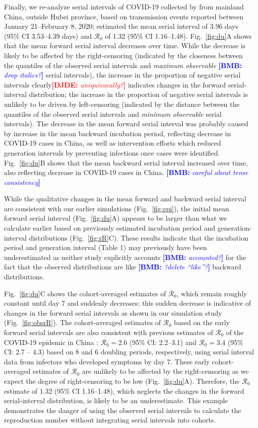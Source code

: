 \documentclass[12pt]{article}
\newcommand{\comment}{\showcomment}
\newcommand{\showcomment}[3]{\textcolor{#1}{\textbf{[#2: }\textsl{#3}\textbf{]}}}
\newcommand{\bmb}[1]{\comment{blue}{BMB}{#1}}
\newcommand{\djde}[1]{\comment{red}{DJDE}{#1}}
\newcommand{\fref}[1]{Fig.~\ref{fig:#1}}
\newcommand{\Rx}[1]{\ensuremath{{\mathcal R}_{#1}}\xspace}
\newcommand{\Ro}{\Rx{0}}
\begin{document}
Finally, we re-analyze serial intervals of COVID-19 collected by \cite{du2020serial} from mainland China, outside Hubei province, based on transmission events reported between January 21--February 8, 2020;
\cite{du2020serial} estimated the mean serial interval of 3.96 days (95\% CI 3.53–4.39 days) and \Ro of 1.32 (95\% CI 1.16–1.48).
\fref{du}A shows that the mean forward serial interval decreases over time.
While the decrease is likely to be affected by the right-censoring (indicated by the closeness between the quantiles of the observed serial intervals and \emph{maximum observable} \bmb{drop italics?} serial intervals), the increase in the proportion of negative serial intervals clearly\djde{unequivocally?} indicates changes in the forward serial-interval distribution;
the increase in the proportion of negative serial intervals is unlikely to be driven by left-censoring (indicated by the distance between the quantiles of the observed serial intervals and \emph{minimum observable} serial intervals).
The decrease in the mean forward serial interval was probably caused by increase in the mean backward incubation period, reflecting decrease in COVID-19 cases in China, as well as intervention efforts which reduced generation intervals by preventing infections once cases were identified.
\fref{du}B shows that the mean backward serial interval increased over time, also reflecting decrease in COVID-19 cases in China.
\bmb{careful about tense consistency}

While the qualitative changes in the mean forward and backward serial interval are consistent with our earlier simulations (\fref{epi}), the initial mean forward serial interval (\fref{du}A) appears to be larger than what we calculate earlier based on previously estimated incubation period and generation-interval distributions (\fref{rR}C).
These results indicate that the incubation period and generation interval (Table 1) may previously have been underestimated as neither study explicitly accounts \bmb{accounted?} for the fact that the observed distributions are like \bmb{?delete ``like''?} backward distributions.

\fref{du}C shows the cohort-averaged estimates of \Ro, which remain roughly constant until day 7 and suddenly decreases;
this sudden decrease is indicative of changes in the forward serial intervals as shown in our simulation study (\fref{obsrR}).
The cohort-averaged estimates of \Ro based on the early forward serial intervals are also consistent with previous estimates of \Ro of the COVID-19 epidemic in China \citep{majumder2020early, park2020reconciling}:
$\Ro = 2.6$ (95\% CI: 2.2--3.1) and $\Ro = 3.4$ (95\% CI: 2.7 -- 4.3) based on 8 and 6 doubling periods, respectively, using serial interval data from infectors who developed symptoms by day 7.
These early cohort-averaged estimates of \Ro are unlikely to be affected by the right-censoring as we expect the degree of right-censoring to be low (\fref{du}A).
Therefore, the \Ro estimate of 1.32 (95\% CI 1.16–1.48), which neglects the changes in the forward serial-interval distribution, is likely to be an underestimate.
This example demonstrates the danger of using the observed serial intervals to calculate the reproduction number without integrating serial intervals into cohorts.
\end{document}
